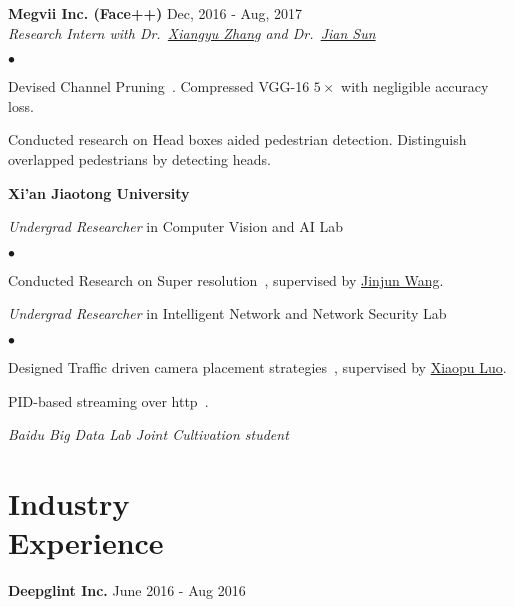 \documentclass[margin,line]{res}
\newenvironment{list2}{
  \begin{list}{$\bullet$}{%
      \setlength{\itemsep}{0in}
      \setlength{\parsep}{0in} \setlength{\parskip}{0in}
      \setlength{\topsep}{0in} \setlength{\partopsep}{0in} 
      \setlength{\leftmargin}{0.2in}}}{\end{list}}
\begin{document}
\begin{resume}
{\bf Megvii Inc. (Face++)} \hfill {Dec, 2016 - Aug, 2017}\\%

\vspace{-.3in}
{\em Research Intern with Dr.~\href{https://scholar.google.com/citations?user=yuB-cfoAAAAJ&hl=en&oi=ao}{Xiangyu Zhang} and Dr.~\href{http://www.jiansun.org/}{Jian Sun}} %
\begin{list2}
\item Devised Channel Pruning~\cite{He_2017_ICCV}. Compressed VGG-16 $5\times$ with negligible accuracy loss.
\item Conducted research on Head boxes aided pedestrian detection. Distinguish overlapped pedestrians by detecting heads.
\end{list2}

{\bf Xi'an Jiaotong University} %
\vspace{-.3cm}

{\em Undergrad Researcher} in Computer Vision and AI Lab %
\begin{list2}
\item Conducted Research on Super resolution~\cite{liang2017single}, supervised by \href{https://scholar.google.com/citations?user=Dk7JgNcAAAAJ&hl=en}{Jinjun Wang}.
\end{list2}

{\em Undergrad Researcher} in Intelligent Network and Network Security Lab%
\begin{list2}
\item Designed Traffic driven camera placement strategies~\cite{ma2017vehicle}, supervised by \href{http://www4.comp.polyu.edu.hk/~csxluo/}{Xiaopu Luo}.
\item PID-based streaming over http~\cite{pid}.
\end{list2}

{\em Baidu Big Data Lab Joint Cultivation student} %

\section{\sc Industry \\Experience}
{\bf Deepglint Inc.} \hfill {June 2016 - Aug 2016}\\%


\end{resume}
\end{document}
